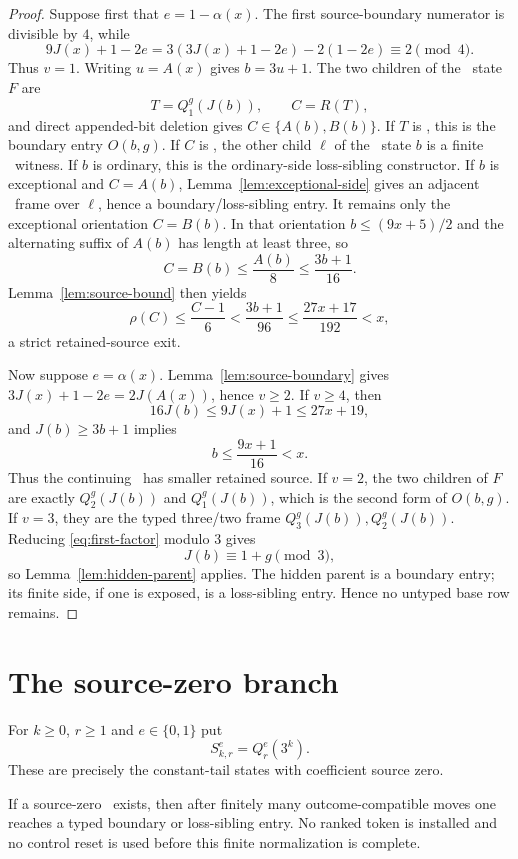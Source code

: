 \begin{proof}
Suppose first that $e=1-\alpha(x)$. The first source-boundary numerator is
divisible by $4$, while
\[
9J(x)+1-2e=3(3J(x)+1-2e)-2(1-2e)\equiv2\pmod4.
\]
Thus $v=1$. Writing $u=A(x)$ gives $b=3u+1$. The two children of the \DRAW\
state $F$ are
\[
  T=Q_1^g(J(b)),\qquad C=R(T),
\]
and direct appended-bit deletion gives
$C\in\{A(b),B(b)\}$. If $T$ is \DRAW, this is the boundary entry
$O(b,g)$. If $C$ is \DRAW, the other child $\ell$ of the \WIN\ state $b$ is a
finite \LOSS\ witness. If $b$ is ordinary, this is the ordinary-side
loss-sibling constructor. If $b$ is exceptional and $C=A(b)$,
Lemma~\ref{lem:exceptional-side} gives an adjacent \DRAW\ frame over
$\ell$, hence a boundary/loss-sibling entry. It remains only the exceptional
orientation $C=B(b)$. In that orientation
$b\le(9x+5)/2$ and the alternating suffix of $A(b)$ has length at least three,
so
\[
 C=B(b)\le\frac{A(b)}8\le\frac{3b+1}{16}.
\]
Lemma~\ref{lem:source-bound} then yields
\[
 \rho(C)\le\frac{C-1}{6}<\frac{3b+1}{96}
 \le\frac{27x+17}{192}<x,
\]
a strict retained-source exit.

Now suppose $e=\alpha(x)$. Lemma~\ref{lem:source-boundary} gives
$3J(x)+1-2e=2J(A(x))$, hence $v\ge2$. If $v\ge4$, then
\[
16J(b)\le9J(x)+1\le27x+19,
\]
and $J(b)\ge3b+1$ implies
\[
  b\le\frac{9x+1}{16}<x.
\]
Thus the continuing \DRAW\ has smaller retained source. If $v=2$, the two
children of $F$ are exactly $Q_2^g(J(b))$ and $Q_1^g(J(b))$, which is the
second form of $O(b,g)$. If $v=3$, they are the typed three/two frame
$Q_3^g(J(b)),Q_2^g(J(b))$. Reducing
\eqref{eq:first-factor} modulo $3$ gives
\[
  J(b)\equiv1+g\pmod3,
\]
so Lemma~\ref{lem:hidden-parent} applies. The hidden parent is a boundary
entry; its finite side, if one is exposed, is a loss-sibling entry. Hence no
untyped base row remains.
\end{proof}

\section{The source-zero branch}

For $k\ge0$, $r\ge1$ and $e\in\{0,1\}$ put
\[
  S_{k,r}^e=Q_r^e(3^k).
\]
These are precisely the constant-tail states with coefficient source zero.

\begin{lemma}\label{lem:zero-source}
If a source-zero \DRAW\ exists, then after finitely many outcome-compatible
moves one reaches a typed boundary or loss-sibling entry.  No ranked token is
installed and no control reset is used before this finite normalization is
complete.
\end{lemma}

